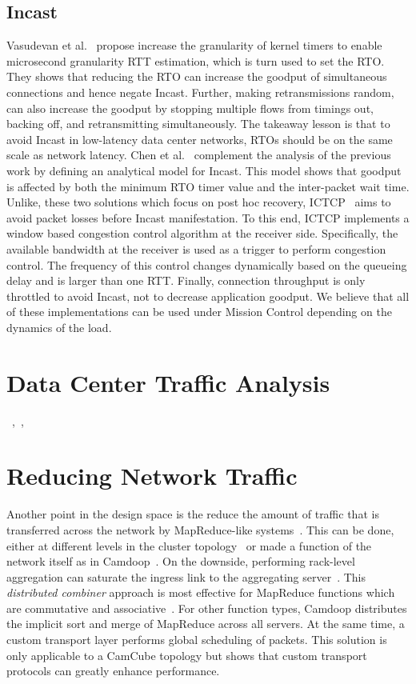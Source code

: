 \documentclass[a4paper,12pt,twoside,openright]{report}
\begin{document}
\subsection{Incast}
Vasudevan et al.~\cite{Vasudevan:2009:SEF} propose increase the granularity of
kernel timers to enable microsecond granularity RTT estimation, which is turn
used to set the RTO. They shows that reducing the RTO can increase the goodput
of simultaneous connections and hence negate Incast. Further, making
retransmissions random, can also increase the goodput by stopping multiple flows
from timings out, backing off, and retransmitting simultaneously. The takeaway
lesson is that to avoid Incast in low-latency data center networks, RTOs should
be on the same scale as network latency. Chen et al.~\cite{Chen:2009:UTI}
complement the analysis of the previous work by defining an analytical model for
Incast. This model shows that goodput is affected by both the minimum RTO timer
value and the inter-packet wait time. Unlike, these two solutions which focus on
post hoc recovery, ICTCP~\cite{Wu:2010:IIC} aims to avoid packet losses before
Incast manifestation. To this end, ICTCP implements a window based congestion
control algorithm at the receiver side. Specifically, the available bandwidth at
the receiver is used as a trigger to perform congestion control.
The frequency of this control changes dynamically based on the queueing delay
and is larger than one RTT. Finally, connection throughput is only throttled to
avoid Incast, not to decrease application goodput. We believe that all of these
implementations can be used under Mission Control depending on the dynamics
of the load.

\section{Data Center Traffic Analysis}
~\cite{Benson:2010:NTC},~\cite{Benson:2009:UDC},~\cite{Kandula:2009:NDC}

\section{Reducing Network Traffic}
Another point in the design space is the reduce the amount of traffic that is
transferred across the network by MapReduce-like
systems~\cite{Costa:2012:CEI,Yu:2009:DAD}. This can be done, either at different
levels in the cluster topology~\cite{Yu:2009:DAD} or made a function of the
network itself as in Camdoop~\cite{Costa:2012:CEI}. On the downside, performing
rack-level aggregation can saturate the ingress link to the aggregating
server~\cite{Yu:2009:DAD}. This \emph{distributed combiner} approach is most
effective for MapReduce functions which are commutative and
associative~\cite{Dean:2004:MSD}. For other function types, Camdoop distributes
the implicit sort and merge of MapReduce across all servers. At the same time, a
custom transport layer performs global scheduling of packets. This solution is
only applicable to a CamCube topology but shows that custom transport protocols
can greatly enhance performance.
\end{document}
